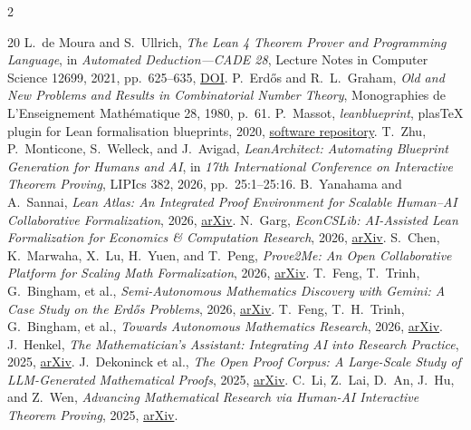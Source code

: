 \documentclass[10pt]{article}
\begin{document}
{\tiny
\begin{multicols}{2}
\begin{thebibliography}{20}
\setlength{\itemsep}{0pt}
\setlength{\parsep}{0pt}
 L.~de Moura and S.~Ullrich, \emph{The Lean 4 Theorem Prover
and Programming Language}, in \emph{Automated Deduction---CADE 28}, Lecture
Notes in Computer Science 12699, 2021, pp.~625--635,
\href{https://doi.org/10.1007/978-3-030-79876-5_37}{DOI}.
 P.~Erd\H{o}s and R.~L.~Graham, \emph{Old and New
Problems and Results in Combinatorial Number Theory}, Monographies de
L'Enseignement Math\'ematique 28, 1980, p.~61.
 P.~Massot, \emph{leanblueprint}, plasTeX plugin for
Lean formalisation blueprints, 2020,
\href{https://github.com/PatrickMassot/leanblueprint}{software repository}.
 T.~Zhu, P.~Monticone, S.~Welleck, and J.~Avigad,
\emph{LeanArchitect: Automating Blueprint Generation for Humans and AI},
in \emph{17th International Conference on Interactive Theorem Proving},
LIPIcs 382, 2026, pp.~25:1--25:16.
 B.~Yanahama and A.~Sannai, \emph{Lean Atlas: An
Integrated Proof Environment for Scalable Human--AI Collaborative
Formalization}, 2026, \href{https://doi.org/10.48550/arXiv.2604.16347}{arXiv}.
 N.~Garg, \emph{EconCSLib: AI-Assisted Lean Formalization for
Economics \& Computation Research}, 2026,
\href{https://doi.org/10.48550/arXiv.2606.13306}{arXiv}.
 S.~Chen, K.~Marwaha, X.~Lu, H.~Yuen, and T.~Peng,
\emph{Prove2Me: An Open Collaborative Platform for Scaling Math
Formalization}, 2026, \href{https://doi.org/10.48550/arXiv.2608.28433}{arXiv}.
 T.~Feng, T.~Trinh, G.~Bingham, et al., \emph{Semi-Autonomous
Mathematics Discovery with Gemini: A Case Study on the Erd\H{o}s Problems},
2026, \href{https://doi.org/10.48550/arXiv.2601.22401}{arXiv}.
 T.~Feng, T.~H.~Trinh, G.~Bingham, et al.,
\emph{Towards Autonomous Mathematics Research}, 2026,
\href{https://doi.org/10.48550/arXiv.2602.10177}{arXiv}.
 J.~Henkel, \emph{The Mathematician's Assistant:
Integrating AI into Research Practice}, 2025,
\href{https://doi.org/10.48550/arXiv.2508.20236}{arXiv}.
 J.~Dekoninck et al., \emph{The Open Proof
Corpus: A Large-Scale Study of LLM-Generated Mathematical Proofs}, 2025,
\href{https://doi.org/10.48550/arXiv.2506.21621}{arXiv}.
 C.~Li, Z.~Lai, D.~An, J.~Hu, and Z.~Wen, \emph{Advancing
Mathematical Research via Human-AI Interactive Theorem Proving}, 2025,
\href{https://doi.org/10.48550/arXiv.2512.09443}{arXiv}.

\end{thebibliography}
\end{multicols}}
\end{document}
